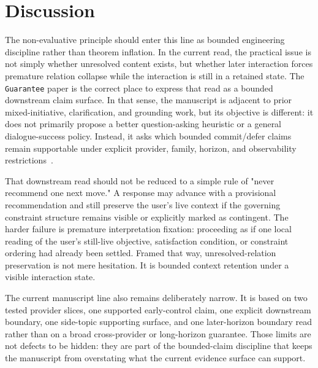 \documentclass[11pt]{article}
\begin{document}
\section{Discussion}

The non-evaluative principle should enter this line as bounded engineering
discipline rather than theorem inflation. In the current read, the practical issue
is not simply whether unresolved content exists, but whether later interaction
forces premature relation collapse while the interaction is still in a retained
state. The \texttt{Guarantee} paper is the correct place to express that read as
a bounded downstream claim surface. In that sense, the manuscript is adjacent to
prior mixed-initiative, clarification, and grounding work, but its objective is
different: it does not primarily propose a better question-asking heuristic or a
general dialogue-success policy. Instead, it asks which bounded commit/defer
claims remain supportable under explicit provider, family, horizon, and
observability restrictions~\cite{chucarroll2000mimic,deboni2003clarification,rao2018evpi,benotti2021grounding,sahay-etal-2025-ask,wen-etal-2025-know,madhusudhan-etal-2025-llms}.

That downstream read should not be reduced to a simple rule of "never recommend
one next move." A response may advance with a provisional recommendation and
still preserve the user's live context if the governing constraint structure
remains visible or explicitly marked as contingent. The harder failure is
premature interpretation fixation: proceeding as if one local reading of the
user's still-live objective, satisfaction condition, or constraint ordering had
already been settled. Framed that way, unresolved-relation preservation is not
mere hesitation. It is bounded context retention under a visible interaction
state.

The current manuscript line also remains deliberately narrow. It is based on
two tested provider slices, one supported early-control claim, one explicit
downstream boundary, one side-topic supporting surface, and one later-horizon
boundary read rather than on a broad cross-provider or long-horizon guarantee.
Those limits are not defects to be hidden: they are part of the bounded-claim
discipline that keeps the manuscript from overstating what the current evidence
surface can support.
\end{document}
